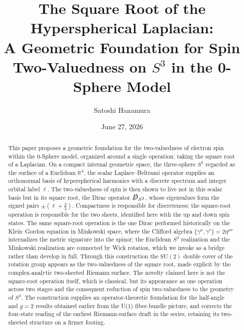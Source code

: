 \documentclass[%
 reprint, amsmath,amssymb, aps, prb, ]{revtex4-2}
\numberwithin{equation}{section}
\begin{document}
\title{The Square Root of the Hyperspherical Laplacian:\\ A Geometric Foundation for Spin Two-Valuedness on $S^{3}$ in the 0-Sphere Model}

\author{Satoshi Hanamura}

\date{June 27, 2026}

\begin{abstract}
This paper proposes a geometric foundation for the two-valuedness of electron spin within the 0-Sphere model, organized around a single operation: taking the square root of a Laplacian.
On a compact internal geometric space, the three-sphere $S^{3}$ regarded as the surface of a Euclidean $\mathbb{R}^{4}$, the scalar Laplace--Beltrami operator supplies an orthonormal basis of hyperspherical harmonics with a discrete spectrum and integer orbital label $\ell$.
The two-valuedness of spin is then shown to live not in this scalar basis but in its square root, the Dirac operator $\slashed{D}_{S^{3}}$, whose eigenvalues form the signed pairs $\pm(\ell+\tfrac{3}{2})$.
Compactness is responsible for discreteness; the square-root operation is responsible for the two sheets, identified here with the up and down spin states.
The same square-root operation is the one Dirac performed historically on the Klein--Gordon equation in Minkowski space, where the Clifford algebra $\{\gamma^{\mu},\gamma^{\nu}\}=2\eta^{\mu\nu}$ internalizes the metric signature into the spinor; the Euclidean $S^{3}$ realization and the Minkowski realization are connected by Wick rotation, which we invoke as a bridge rather than develop in full.
Through this construction the $\mathrm{SU}(2)$ double cover of the rotation group appears as the two-valuedness of the square root, made explicit by the complex-analytic two-sheeted Riemann surface.
The novelty claimed here is not the square-root operation itself, which is classical, but its appearance as one operation across two stages and the consequent reduction of spin two-valuedness to the geometry of $S^{3}$.
The construction supplies an operator-theoretic foundation for the half-angle and $g=2$ results obtained earlier from the U(1) fiber-bundle picture, and corrects the four-state reading of the earliest Riemann-surface draft in the series, retaining its two-sheeted structure on a firmer footing.
\end{abstract}

\maketitle
\end{document}
